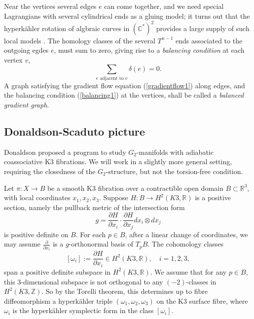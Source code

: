 \documentclass{article}
\theoremstyle{definition}
\newcommand{\R}{\mathbb{R}}
\newcommand{\C}{\mathbb{C}}
\newcommand{\Z}{\mathbb{Z}}
\begin{document}
		
		
		
		Near the vertices several edges $e$ can come together, and we need special Lagrangians with several cylindrical ends as a gluing model; it turns out that the hyperk\"ahler rotation of algbraic curves in $(\C^*)^2$ provides a large supply of such local models \cite{ChiuLiLin}. The homology classes of the several $T^{n-1}$ ends associated to the outgoing egdes $e$, must sum to zero, giving rise to a \emph{balancing condition} at each vertex $v$,
		\begin{equation}\label{balancing1}
			\sum_{ \text{$e$ adjacent to $v$} } \delta(e)=0.
		\end{equation}
		A graph satisfying the gradient flow equation (\ref{gradientflow1}) along edges, and the balancing condition (\ref{balancing1}) at the vertices, shall be called a \emph{balanced gradient graph}.
		
		

		
		
		\subsection{Donaldson-Scaduto picture}
		
		
		
		
		Donaldson \cite{Donaldson} proposed a program to study $G_2$-manifolds with adiabatic coassociative K3 fibrations. We will work in a slightly more general setting, requiring the closedness of the $G_2$-structure, but not the torsion-free condition. 
		
		
		
		
		Let $\pi: X\to B$ be a smooth  K3 fibration over a contractible open domain $B\subset \R^3$, with local coordinates $x_1,x_2,x_3$. Suppose $H: B\to H^2(K3,\R)$ is a positive section, namely the pullback metric of the intersection form
		\[
	g=	\frac{\partial H}{\partial x_i}\cdot 	\frac{\partial H}{\partial x_j} dx_i\otimes dx_j
		\]
	is positive definite on $B$. For each $p\in B$, after a linear change of coordinates, we may assume $\frac{\partial}{\partial x_i}$ is a $g$-orthonormal basis of $T_p B$. The cohomology classes 
	\[
[	\omega_i]:=  \frac{\partial H}{\partial x_i} \in H^2(K3,\R),\quad i=1,2,3,
	\]
		span a positive definite subspace in $H^2(K3,\R)$. We assume that for any $p\in B$,  this 3-dimensional subspace is not orthogonal to any  $(-2)$-classes in $H^2(K3,\Z)$.
		So by the Torelli theorem, this determines up to fibre diffeomorphism a hyperk\"ahler triple $(\omega_1, \omega_2, \omega_3) $ on the K3 surface fibre, where $\omega_i$ is the hyperk\"ahler symplectic form in the class $[\omega_i]$.  
		
\end{document}
